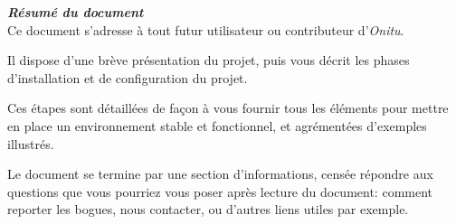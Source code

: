 \thispagestyle{empty}
\vspace*{10mm}

\textbf{\emph{\textcolor{onitu}{\large{Résumé du document} } } }\\

Ce document s'adresse à tout futur utilisateur ou contributeur d'\emph{Onitu}.

Il dispose d'une brève présentation du projet, puis vous décrit les phases d'installation et de configuration du projet.

Ces étapes sont détaillées de façon à vous fournir tous les éléments pour mettre en place un environnement stable et fonctionnel, et agrémentées d'exemples illustrés.

Le document se termine par une section d'informations, censée répondre aux questions que vous pourriez vous poser après lecture du document: comment reporter les bogues, nous contacter, ou d'autres liens utiles par exemple.

\clearpage
